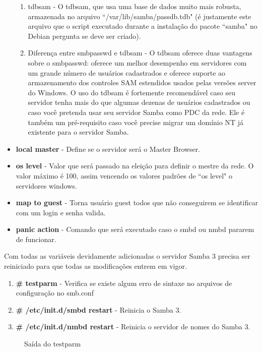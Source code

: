 \begin{itemize}
\begin{enumerate}
			\item{tdbsam} - O tdbsam, que usa uma base de dados muito mais robusta, armazenada no arquivo ``/var/lib/samba/passdb.tdb" (é justamente este arquivo que o script executado durante a instalação do pacote ``samba" no Debian pergunta se deve ser criado).\cite{BACKEND}
			\item{Diferença entre smbpasswd e tdbsam} - O tdbsam oferece duas vantagens sobre o smbpasswd: oferece um melhor desempenho em servidores com um grande número de usuários cadastrados e oferece suporte ao armazenamento dos controles SAM estendidos usados pelas versões server do Windows. O uso do tdbsam é fortemente recomendável caso seu servidor tenha mais do que algumas dezenas de usuários cadastrados ou caso você pretenda usar seu servidor Samba como PDC da rede. Ele é também um pré-requisito caso você precise migrar um domínio NT já existente para o servidor Samba. \cite{BACKEND}
		\end{enumerate}
	\item \textbf{local master} - Define se o servidor será o Master Browser.
	\item \textbf{os level} - Valor que será passado na eleição para definir o mestre da rede. O valor máximo é 100, assim vencendo os valores padrões de ``os level" o servidores windows.
	\item \textbf{map to guest} - Torna usuário guest todos que não conseguirem se identificar com um login e senha valida.
	\item \textbf{panic action} - Comando que será executado caso o smbd ou nmbd pararem de funcionar.
\end{itemize}

Com todas as variáveis devidamente adicionadas o servidor Samba 3 precisa ser reiniciado para que todas as modificações entrem em vigor.

\begin{enumerate}
	\item \textbf{\# testparm} - Verifica se existe algum erro de sintaxe no arquivos de configuração no smb.conf
	\item \textbf{\# /etc/init.d/smbd restart} - Reinicia o Samba 3.
	\item \textbf{\# /etc/init.d/nmbd restart} - Reinicia o servidor de nomes do Samba 3.
\end{enumerate}

\begin{figure}[ht]
   	\centering
   	\caption{Saída do testparm}
    \label{testparm}
\end{figure}

